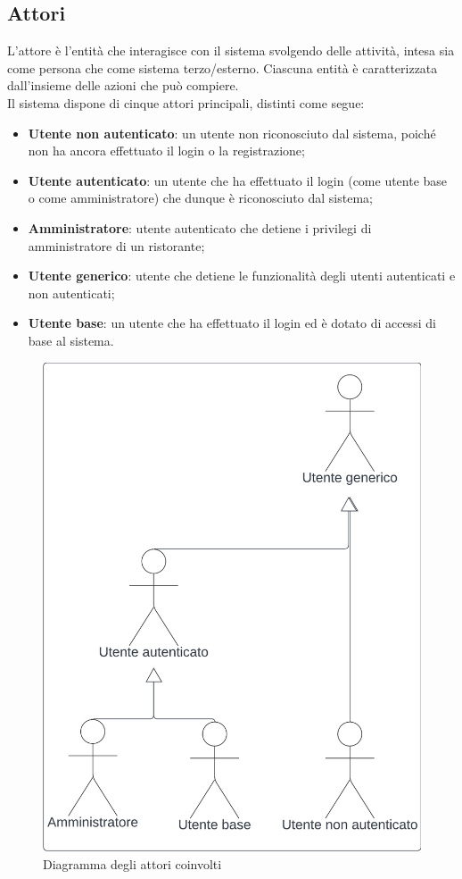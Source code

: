 \documentclass[12pt, oneside]{article}
\begin{document}
\subsection{Attori}
L'attore è l'entità che interagisce con il sistema svolgendo delle attività, intesa sia come persona che come sistema terzo/esterno. Ciascuna entità è caratterizzata dall’insieme delle azioni che può compiere. \\
Il sistema dispone di cinque attori principali, distinti come segue:
\begin{itemize}
    \item \textbf{Utente non autenticato}: un utente non riconosciuto dal sistema, poiché non ha ancora  effettuato il login o la registrazione;
    \item \textbf{Utente autenticato}: un utente che ha effettuato il login (come utente base o come amministratore) che dunque è riconosciuto dal sistema;
    \item \textbf{Amministratore}: utente autenticato che detiene i privilegi di amministratore di un ristorante;
    \item \textbf{Utente generico}: utente che detiene le funzionalità degli utenti autenticati e non autenticati;
    \item \textbf{Utente base}: un utente che ha effettuato il login ed è dotato di accessi di base al sistema.
\end{itemize}

\begin{figure}[H]
\centering
\includegraphics[width=0.4\linewidth]{Attori_coinvolti.png}
\caption{Diagramma degli attori coinvolti}
\end{figure}
\newpage



%
\end{document}
